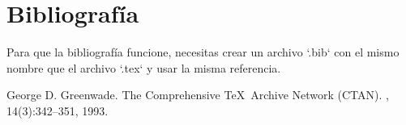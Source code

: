 \documentclass{article}
\begin{document}
\section{Bibliografía}
Para que la bibliografía funcione, necesitas crear un archivo `.bib` con el mismo nombre que el archivo `.tex` y usar la misma referencia.

\begin{thebibliography}{99}

George D. Greenwade.
\newblock The Comprehensive \TeX\ Archive Network (CTAN).
, 14(3):342--351, 1993.

\end{thebibliography}
\end{document}
